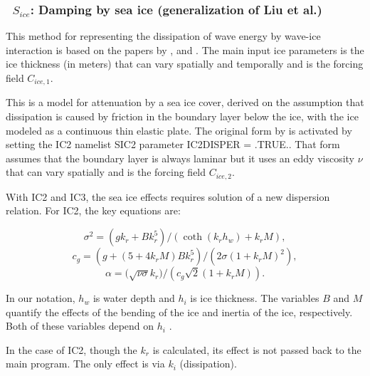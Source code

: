 \vsssub
\subsubsection{~$S_{ice}$: Damping by sea ice (generalization of Liu et al.)} \label{sec:ICE2}
\vsssub


\noindent
This method for representing the dissipation of wave energy by wave-ice interaction is based on the papers
by \cite{art:LMC88}, \cite{art:LHV91} and \cite{art:Aea15}. The main input ice parameters
is the ice thickness (in meters) that can vary spatially and temporally and is the forcing field  ${C_{ice,1}}$. 

This is a model for attenuation by a
sea ice cover, derived on the assumption that dissipation is caused by
friction in the boundary layer below the ice,
with the ice modeled as a continuous thin elastic plate. The original form by  \cite{art:LMC88} is activated by 
setting the {\code IC2} namelist {\F SIC2} parameter {\code IC2DISPER = .TRUE.}. That form 
 assumes that the boundary layer is always laminar but it uses an eddy viscosity ${\nu}$ that can vary spatially 
and is the forcing field ${C_{ice,2}}$. 

With {\code IC2} and {\code IC3}, the sea ice effects requires solution of a
new dispersion relation. For {\code IC2}, the key equations are:

\begin{equation}\label{eq:ice1}
  {\sigma}^2 = ({gk_r} + {Bk_r^5})/(\coth({k_r}{h_w}) + {k_r}{M}),
\end{equation}
\begin{equation}\label{eq:ice2}
  {c_g} = (g + (5 + 4{k_r}{M}){B}{k_r^5})/(2{\sigma}(1+{k_r}{M})^2),
\end{equation}
\begin{equation}\label{eq:ice3}
  {\alpha} = (\sqrt{{\nu\sigma}}{k_r)}/({c_g}\sqrt{2}(1+{k_r}{M})).
\end{equation}

\noindent
In our notation, $h_w$ is water depth and $h_i$ is ice thickness.  The
variables $B$ and $M$ quantify the effects of the bending of the ice and
inertia of the ice, respectively. Both of these variables depend on $h_i$ 
\citep[see][]{art:LMC88, art:LHV91}.

\vspace{\baselineskip} \noindent
In the case of {\code IC2}, though the ${k_r}$ is calculated, its effect is
not passed back to the main program. The only effect is via ${k_i}$
(dissipation).


